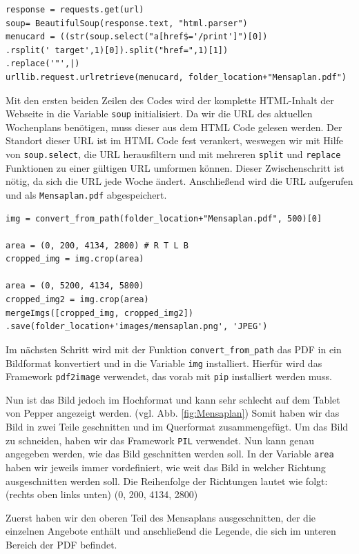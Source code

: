 \begin{lstlisting}
response = requests.get(url)
soup= BeautifulSoup(response.text, "html.parser")
menucard = ((str(soup.select("a[href$='/print']")[0])
.rsplit(' target',1)[0]).split("href=",1)[1])
.replace('"',|)
urllib.request.urlretrieve(menucard, folder_location+"Mensaplan.pdf")
\end{lstlisting}

Mit den ersten beiden Zeilen des Codes wird der komplette HTML-Inhalt der Webseite in die Variable \verb|soup| initialisiert. Da wir die URL des aktuellen Wochenplans benötigen, muss dieser aus dem HTML Code gelesen werden. Der Standort dieser URL ist im HTML Code fest verankert, weswegen wir mit Hilfe von \verb|soup.select|, die URL herausfiltern und mit mehreren \verb|split| und \verb|replace| Funktionen zu einer gültigen URL umformen können. Dieser Zwischenschritt ist nötig, da sich die URL jede Woche ändert. Anschließend wird die URL aufgerufen und als \verb|Mensaplan.pdf| abgespeichert.\\

\begin{lstlisting}
img = convert_from_path(folder_location+"Mensaplan.pdf", 500)[0]

area = (0, 200, 4134, 2800) # R T L B
cropped_img = img.crop(area)

area = (0, 5200, 4134, 5800)
cropped_img2 = img.crop(area)
mergeImgs([cropped_img, cropped_img2])
.save(folder_location+'images/mensaplan.png', 'JPEG')
\end{lstlisting}

Im nächsten Schritt wird mit der Funktion \verb|convert_from_path| das PDF in ein Bildformat konvertiert und in die Variable \verb|img| installiert. Hierfür wird das Framework \verb|pdf2image| verwendet, das vorab mit \verb|pip| installiert werden muss. 

Nun ist das Bild jedoch im Hochformat und kann sehr schlecht auf dem Tablet von Pepper angezeigt werden. (vgl. Abb. \ref{fig:Mensaplan}) Somit haben wir das Bild in zwei Teile geschnitten und im Querformat zusammengefügt. Um das Bild zu schneiden, haben wir das Framework \verb|PIL| verwendet. Nun kann genau angegeben werden, wie das Bild geschnitten werden soll. In der Variable \verb|area| haben wir jeweils immer vordefiniert, wie weit das Bild in welcher Richtung ausgeschnitten werden soll. Die Reihenfolge der Richtungen lautet wie folgt: 
(rechts oben links unten) (0, 200, 4134, 2800)

Zuerst haben wir den oberen Teil des Mensaplans ausgeschnitten, der die einzelnen Angebote enthält und anschließend die Legende, die sich im unteren Bereich der PDF befindet. 

